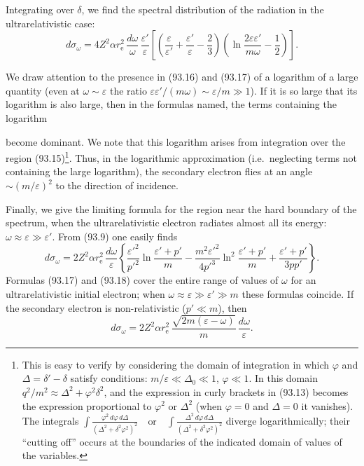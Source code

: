 Integrating over $\delta$, we find the spectral distribution of the radiation in the ultrarelativistic case:
\begin{equation}
d\sigma_\omega = 4Z^2\alpha r_\mathrm{e}^2\,\frac{d\omega}{\omega}\,\frac{\varepsilon'}{\varepsilon}\left[\left(\frac{\varepsilon}{\varepsilon'} + \frac{\varepsilon'}{\varepsilon} - \frac{2}{3}\right)\left(\ln\frac{2\varepsilon\varepsilon'}{m\omega} - \frac{1}{2}\right)\right].
\label{eq:93.17}
\end{equation}

We draw attention to the presence in (93.16) and (93.17) of a logarithm of a large quantity (even at $\omega \sim \varepsilon$ the ratio $\varepsilon\varepsilon'/(m\omega) \sim \varepsilon/m \gg 1$). If it is so large that its logarithm is also large, then in the formulas named, the terms containing the logarithm


become dominant. We note that this logarithm arises from integration over the region (93.15)\footnote{This is easy to verify by considering the domain of integration in which $\varphi$ and $\Delta = \delta'-\delta$ satisfy conditions: $m/\varepsilon \ll \Delta_0 \ll 1$, $\varphi \ll 1$. In this domain $q^2/m^2 \approx \Delta^2 + \varphi^2\delta^2$, and the expression in curly brackets in (93.13) becomes the expression proportional to $\varphi^2$ or $\Delta^2$ (when $\varphi = 0$ and $\Delta = 0$ it vanishes). The integrals
$\int \frac{\varphi^2\,d\varphi\,d\Delta}{(\Delta^2 + \delta^2\varphi^2)^2} \quad \text{or} \quad \int \frac{\Delta^2\,d\varphi\,d\Delta}{(\Delta^2 + \delta^2\varphi^2)^2}$
diverge logarithmically; their ``cutting off'' occurs at the boundaries of the indicated domain of values of the variables.}. Thus, in the logarithmic approximation (i.e.\ neglecting terms not containing the large logarithm), the secondary electron flies at an angle $\sim (m/\varepsilon)^2$ to the direction of incidence.

Finally, we give the limiting formula for the region near the hard boundary of the spectrum, when the ultrarelativistic electron radiates almost all its energy: $\omega \approx \varepsilon \gg \varepsilon'$. From (93.9) one easily finds
\begin{equation}
d\sigma_\omega = 2Z^2\alpha r_\mathrm{e}^2\,\frac{d\omega}{\varepsilon}\left\{\frac{\varepsilon'^2}{p'^2}\ln\frac{\varepsilon'+p'}{m} - \frac{m^2\varepsilon'^2}{4p'^3}\ln^2\frac{\varepsilon'+p'}{m} + \frac{\varepsilon'+p'}{3pp'}\right\}.
\label{eq:93.18}
\end{equation}
Formulas (93.17) and (93.18) cover the entire range of values of $\omega$ for an ultrarelativistic initial electron; when $\omega \approx \varepsilon \gg \varepsilon' \gg m$ these formulas coincide. If the secondary electron is non-relativistic ($p' \ll m$), then
\begin{equation}
d\sigma_\omega = 2Z^2\alpha r_\mathrm{e}^2\,\frac{\sqrt{2m(\varepsilon-\omega)}}{m}\,\frac{d\omega}{\varepsilon}.
\label{eq:93.19}
\end{equation}

